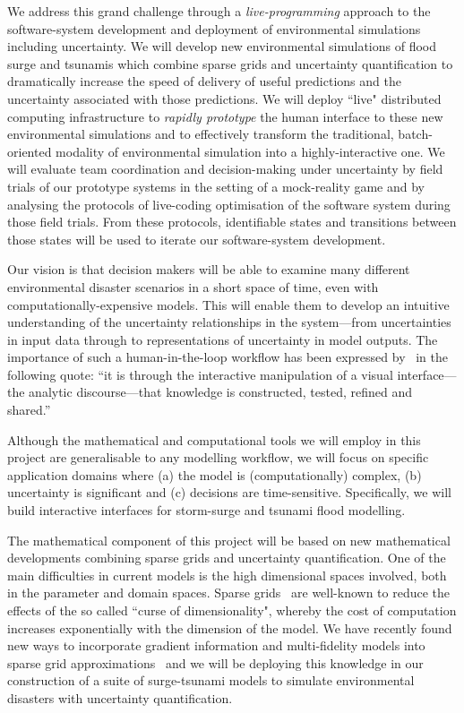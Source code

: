 \documentclass[a4paper,fontsize=12pt]{scrartcl}
\begin{document}
We address this grand
challenge through a {\em live-programming} approach to the software-system development
and deployment of  environmental simulations including uncertainty. 
We will develop new environmental simulations of flood surge and tsunamis which combine sparse grids and uncertainty quantification to dramatically increase the speed of delivery of useful predictions and the uncertainty associated with those predictions.
We will deploy  ``live"  distributed
computing infrastructure to {\em rapidly prototype} the human interface to these new environmental simulations and to effectively transform the
traditional, batch-oriented modality of environmental simulation into a highly-interactive one. We will 
evaluate team coordination and decision-making under uncertainty by field trials of our prototype systems in the setting of a mock-reality game and by analysing the protocols of live-coding optimisation of the software system during those field trials. From these protocols, identifiable states and transitions between those states will be used to iterate our software-system development. 

Our vision is that decision makers
will be able to examine many different environmental disaster scenarios in a short space of
time, even with computationally-expensive models. This will enable
them to develop an intuitive understanding of the uncertainty
relationships in the system---from uncertainties in input data through
to representations of uncertainty in model outputs. The importance of
such a human-in-the-loop workflow has been expressed
by~\textcite{pike_science_2009} in the following quote: ``it is through the interactive
manipulation of a visual interface---the analytic discourse---that
knowledge is constructed, tested, refined and shared.''

Although the mathematical and computational tools we will employ in
this project are generalisable to any modelling workflow, we will
focus on specific application domains where (a) the model is (computationally)
complex, (b) uncertainty is significant and (c) decisions are
time-sensitive. Specifically, we will build interactive interfaces for
 storm-surge and tsunami flood modelling. 

The mathematical component of this project will be based on new
mathematical developments combining sparse grids and uncertainty
quantification. One of the main difficulties in current models is the
high dimensional spaces involved, both in the parameter and
domain spaces. Sparse grids~\parencite{BungartzGriebel2004} are
well-known to reduce the effects of the so called ``curse of
dimensionality", whereby the cost of computation increases
exponentially with the dimension of the model.
We have recently found new ways to incorporate gradient
information and multi-fidelity models into sparse grid
approximations~\parencite{deBaarHarding2015,Jakeman2015,deBaarRDM2015} and we will be
deploying this knowledge in our construction of a suite of surge-tsunami models to simulate
environmental disasters with uncertainty quantification.
\end{document}

